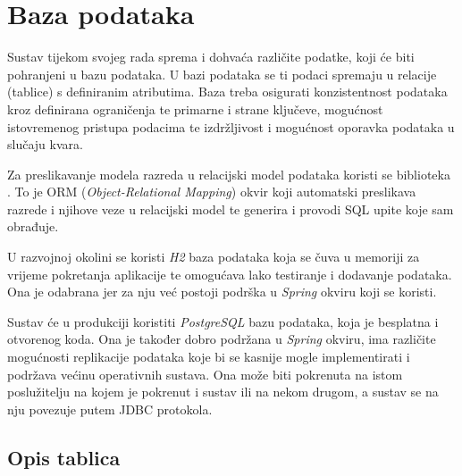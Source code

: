 		

				
		\section{Baza podataka}
			
%			

		Sustav tijekom svojeg rada sprema i dohvaća različite podatke, koji će biti pohranjeni u bazu podataka. U bazi podataka se ti podaci spremaju u relacije (tablice) s definiranim atributima. Baza treba osigurati konzistentnost podataka kroz definirana ograničenja te primarne i strane ključeve, mogućnost istovremenog pristupa podacima te izdržljivost i mogućnost oporavka podataka u slučaju kvara.
		
		Za preslikavanje modela razreda u relacijski model podataka koristi se biblioteka . To je ORM (\textit{Object-Relational Mapping}) okvir koji automatski preslikava razrede i njihove veze u relacijski model te generira i provodi SQL upite koje sam obrađuje.
		
		U razvojnoj okolini se koristi \textit{H2} baza podataka koja se čuva u memoriji za vrijeme pokretanja aplikacije te omogućava lako testiranje i dodavanje podataka. Ona je odabrana jer za nju već postoji podrška u \textit{Spring} okviru koji se koristi.
		
		Sustav će u produkciji koristiti \textit{PostgreSQL} bazu podataka, koja je besplatna i otvorenog koda. Ona je također dobro podržana u \textit{Spring} okviru, ima različite mogućnosti replikacije podataka koje bi se kasnije mogle implementirati i podržava većinu operativnih sustava. Ona može biti pokrenuta na istom poslužitelju na kojem je pokrenut i sustav ili na nekom drugom, a sustav se na nju povezuje putem JDBC protokola.
		
		
		
			\subsection{Opis tablica}
			

				

